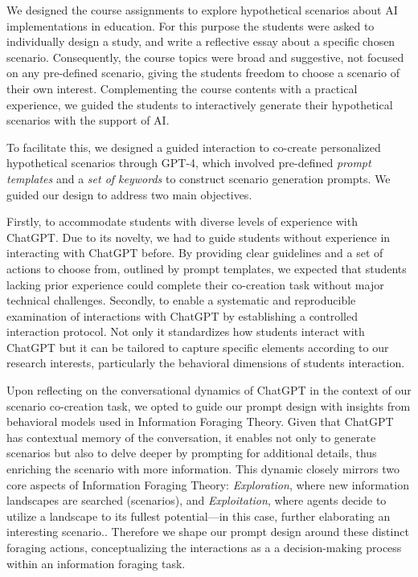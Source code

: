 \documentclass[sn-mathphys, Numbered]{sn-jnl}%
\theoremstyle{thmstyleone}%
\theoremstyle{thmstyletwo}%
\theoremstyle{thmstylethree}%
\begin{document}
We designed the course assignments to explore hypothetical scenarios about AI implementations in education. For this purpose the students were asked to individually design a study, and write a reflective essay about a specific chosen scenario. Consequently, the course topics were broad and suggestive, not focused on any pre-defined scenario, giving the students freedom to choose a scenario of their own interest. 
Complementing the course contents with a practical experience, we guided the students to interactively generate their hypothetical scenarios with the support of AI. 


To facilitate this, we designed a guided interaction to co-create personalized hypothetical scenarios through GPT-4, which involved pre-defined \textit{prompt templates} and a \textit{set of keywords} to construct scenario generation prompts. We guided our design to address two main objectives.

Firstly, to accommodate students with diverse levels of experience with ChatGPT. Due to its novelty, we had to guide students without experience in interacting with ChatGPT before. By providing clear guidelines and a set of actions to choose from, outlined by prompt templates, we expected that students lacking prior experience could complete their co-creation task without major technical challenges.
Secondly, to enable a systematic and reproducible examination of interactions with ChatGPT by establishing a controlled interaction protocol. Not only it standardizes how students interact with ChatGPT but it can be tailored to capture specific elements according to our research interests, particularly the behavioral dimensions of students interaction.

Upon reflecting on the conversational dynamics of ChatGPT in the context of our scenario co-creation task, we opted to guide our prompt design with insights from behavioral models used in Information Foraging Theory. Given that ChatGPT has contextual memory of the conversation, it enables not only to generate scenarios but also to delve deeper by prompting for additional details, thus enriching the scenario with more information. This dynamic closely mirrors two core aspects of Information Foraging Theory: \textit{Exploration}, where new information landscapes are searched (scenarios), and \textit{Exploitation}, where agents decide to utilize a landscape to its fullest potential---in this case, further elaborating an interesting scenario.\parencite{todd_foraging_2020,hills_exploration_2015,cohen_should_2007}. Therefore we shape our prompt design around these distinct foraging actions, conceptualizing the interactions as a a decision-making process within an information foraging task.  %
\end{document}
